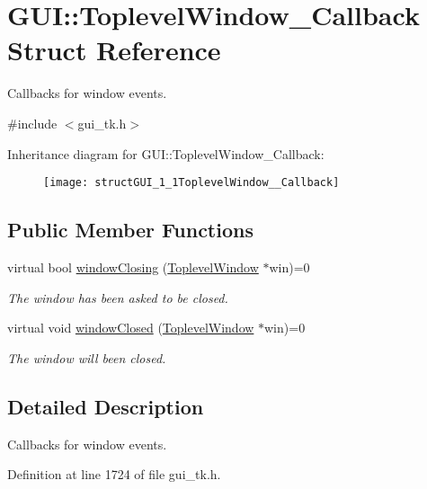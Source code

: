 \hypertarget{structGUI_1_1ToplevelWindow__Callback}{\section{G\-U\-I\-:\-:Toplevel\-Window\-\_\-\-Callback Struct Reference}
\label{structGUI_1_1ToplevelWindow__Callback}
}


Callbacks for window events.  




{\ttfamily \#include $<$gui\-\_\-tk.\-h$>$}

Inheritance diagram for G\-U\-I\-:\-:Toplevel\-Window\-\_\-\-Callback\-:\begin{figure}[H]
\begin{center}
\leavevmode
\texttt{[image: structGUI\_1\_1ToplevelWindow\_\_Callback]}
\end{center}
\end{figure}
\subsection*{Public Member Functions}
\begin{DoxyCompactItemize}
\item 
virtual bool \hyperlink{structGUI_1_1ToplevelWindow__Callback_a3f556e220592d267a7f4d4b79a8f311b}{window\-Closing} (\hyperlink{classGUI_1_1ToplevelWindow}{Toplevel\-Window} $\ast$win)=0
\begin{DoxyCompactList}\small\item\em The window has been asked to be closed. \end{DoxyCompactList}\item 
virtual void \hyperlink{structGUI_1_1ToplevelWindow__Callback_ad02e7827ad3b68f4ea3d0c66fa2a7717}{window\-Closed} (\hyperlink{classGUI_1_1ToplevelWindow}{Toplevel\-Window} $\ast$win)=0
\begin{DoxyCompactList}\small\item\em The window will been closed. \end{DoxyCompactList}\end{DoxyCompactItemize}


\subsection{Detailed Description}
Callbacks for window events. 

Definition at line 1724 of file gui\-\_\-tk.\-h.



